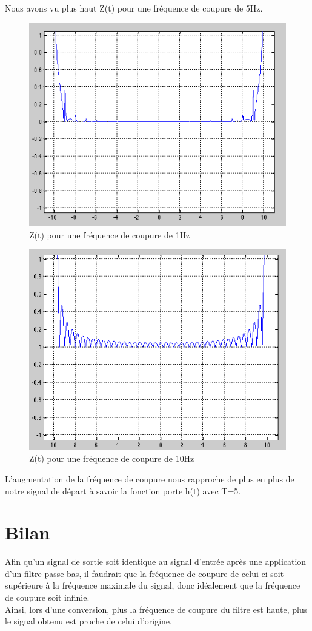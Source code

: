 \documentclass[a4paper, oneside]{report}
\begin{document}
Nous avons vu plus haut Z(t) pour une fr\'equence de coupure de 5Hz.
 
 	\begin{figure}[h]
	\centering
	\includegraphics[scale=0.75]{images/zt1.png}
	\caption{Z(t) pour une fr\'equence de coupure de 1Hz}
	\end{figure}
	
	 \begin{figure}[h]
	\centering
	\includegraphics[scale=0.75]{images/zt10.png}
	\caption{Z(t) pour une fr\'equence de coupure de 10Hz}
	\end{figure}
	

L'augmentation de la fr\'equence de coupure nous rapproche de plus en plus de notre signal de d\'epart \`a savoir la fonction porte h(t) avec T=5.

 \chapter{Bilan}
 
 Afin qu'un signal de sortie soit identique au signal d'entr\'ee apr\`es une application d'un filtre passe-bas, il faudrait que la fr\'equence de coupure de celui ci soit sup\'erieure \`a la fr\'equence maximale du signal, donc id\'ealement que la fr\'equence de coupure soit infinie.
 \\
 Ainsi, lors d'une conversion, plus la fr\'equence de coupure du filtre est haute, plus le signal obtenu est proche de celui d'origine.
  
\end{document}
